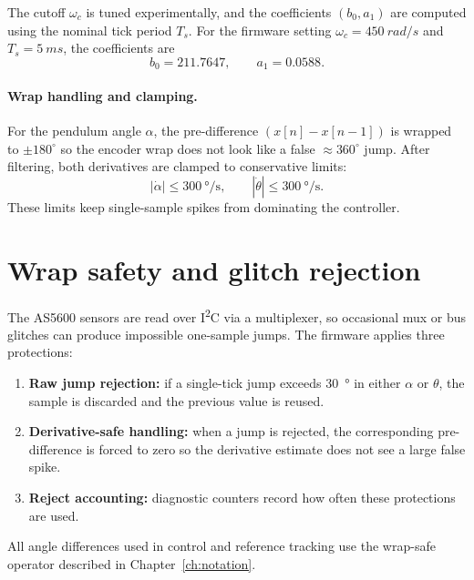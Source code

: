 The cutoff $\omega_c$ is tuned experimentally, and the coefficients $(b_0,a_1)$ are computed using the nominal tick period $T_s$. For the firmware setting $\omega_c=\SI{450}{rad/s}$ and $T_s=\SI{5}{ms}$, the coefficients are
\[
b_0 = 211.7647,\qquad a_1 = 0.0588.
\]

\paragraph{Wrap handling and clamping.}
For the pendulum angle $\alpha$, the pre-difference $(x[n]-x[n-1])$ is wrapped to $\pm 180^\circ$ so the encoder wrap does not look like a false $\approx 360^\circ$ jump. After filtering, both derivatives are clamped to conservative limits:
\[
|\dot{\alpha}| \le \SI{300}{\degree\per\second},\qquad
|\dot{\theta}| \le \SI{300}{\degree\per\second}.
\]
These limits keep single-sample spikes from dominating the controller.

\section{Wrap safety and glitch rejection}
\label{sec:measurement_glitch_rejection}
The AS5600 sensors are read over I\textsuperscript{2}C via a multiplexer, so occasional mux or bus glitches can produce impossible one-sample jumps. The firmware applies three protections:
\begin{enumerate}
  \item \textbf{Raw jump rejection:} if a single-tick jump exceeds \SI{30}{\degree} in either $\alpha$ or $\theta$, the sample is discarded and the previous value is reused.
  \item \textbf{Derivative-safe handling:} when a jump is rejected, the corresponding pre-difference is forced to zero so the derivative estimate does not see a large false spike.
  \item \textbf{Reject accounting:} diagnostic counters record how often these protections are used.
\end{enumerate}

All angle differences used in control and reference tracking use the wrap-safe operator described in Chapter~\ref{ch:notation}.
